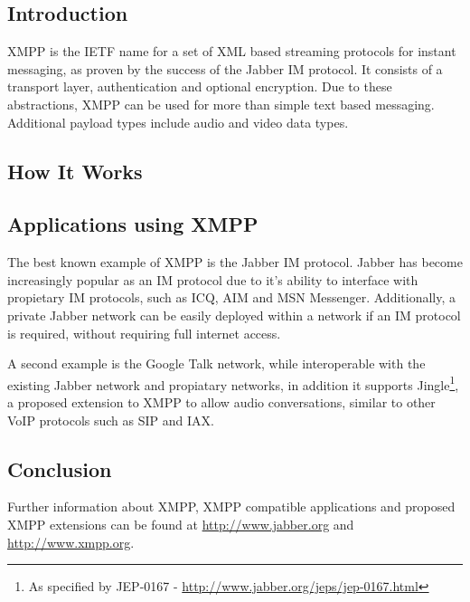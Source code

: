 
\subsection{Introduction}

XMPP is the IETF name for a set of XML based streaming protocols for
instant messaging, as proven by the success of the Jabber IM protocol.
It consists of a transport layer, authentication and optional
encryption. Due to these abstractions, XMPP can be used for more than
simple text based messaging. Additional payload types include audio and
video data types.

\subsection{How It Works}



\subsection{Applications using XMPP}

The best known example of XMPP is the Jabber IM protocol. Jabber has
become increasingly popular as an IM protocol due to it's ability to
interface with propietary IM protocols, such as ICQ, AIM and MSN
Messenger. Additionally, a private Jabber network can be easily 
deployed within a network if an IM protocol is required, without 
requiring full internet access. 


A second example is the Google Talk network, while interoperable with
the existing Jabber network and propiatary networks, in addition it
supports Jingle\footnote{As specified by JEP-0167 - \url{http://www.jabber.org/jeps/jep-0167.html}},
a proposed extension to XMPP to allow audio conversations, similar to
other VoIP protocols such as SIP and IAX.


\subsection{Conclusion}

Further information about XMPP, XMPP compatible applications and
proposed XMPP extensions can be found at \url{http://www.jabber.org} and
\url{http://www.xmpp.org}.
